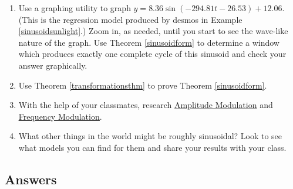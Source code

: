\documentclass{ximera}
\begin{document}
\begin{enumerate}
\normalsize

\medskip

\begin{enumerate}

\item \label{MoonIllumination} Using the techniques discussed in Example \ref{sinusoidsunlight}, fit a sinusoid to these data.\footnote{You may want to plot the data before you find the phase shift.} 

\item  Graph your model along with the data set to judge the reasonableness of the fit.

\item Use the model from \ref{MoonIllumination} to predict the fraction of the moon illuminated on June 1, 2009. \footnote{The listed fraction is $0.62$.}

\item Compare your results to those obtained using a graphing utility.

\end{enumerate}


\item \label{graphdesmosregression}  Use a graphing utility to graph $y = 8.36 \sin(-294.81t  - 26.53) + 12.06$.  (This is the regression model produced by desmos in Example \ref{sinusoidsunlight}.) Zoom in, as needed, until you start to see the wave-like nature of the graph.  Use Theorem \ref{sinusoidform} to determine a window which produces exactly one complete cycle of this sinusoid and check your answer graphically.

\item   \label{proofsinusoidformexercise} Use Theorem \ref{transformationsthm} to prove Theorem \ref{sinusoidform}.


\item  With the help of your classmates, research \href{http://en.wikipedia.org/wiki/Amplitude_modulation}{\underline{Amplitude Modulation}} and \href{http://en.wikipedia.org/wiki/Frequency_modulation}{\underline{Frequency Modulation}}.

\item What other things in the world might be roughly sinusoidal?  Look to see what models you can find for them and share your results with your class.

\end{enumerate}

\newpage


\subsection{Answers}
\end{document}
